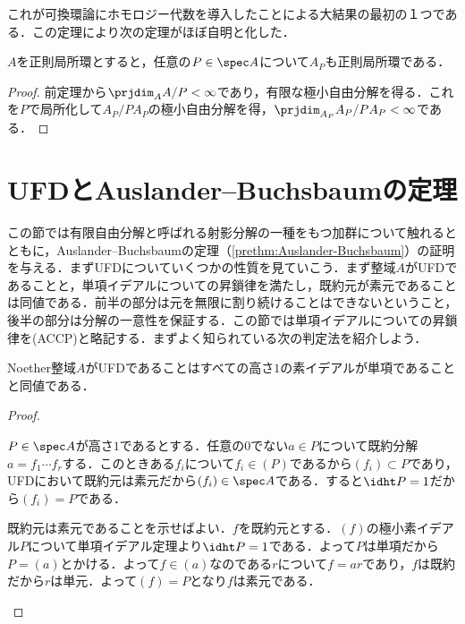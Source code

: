これが可換環論にホモロジー代数を導入したことによる大結果の最初の１つである．この定理により次の定理がほぼ自明と化した．
\begin{thm}[Serreの定理]\label{thm:Serreの定理}
	$A$を正則局所環とすると，任意の$P\in\spec A$について$A_P$も正則局所環である．
\end{thm}

\begin{proof}
	前定理から$\prjdim_A A/P<\infty$であり，有限な極小自由分解を得る．これを$P$で局所化して$A_P/PA_P$の極小自由分解を得，$\prjdim_{A_P} A_P/PA_P<\infty$である．
\end{proof}

\section{UFDとAuslander--Buchsbaumの定理}

この節では有限自由分解と呼ばれる射影分解の一種をもつ加群について触れるとともに，Auslander--Buchsbaumの定理（\ref{prethm:Auslander-Buchsbaum}）の証明を与える．まずUFDについていくつかの性質を見ていこう．まず整域$A$がUFDであることと，単項イデアルについての昇鎖律を満たし，既約元が素元であることは同値である．前半の部分は元を無限に割り続けることはできないということ，後半の部分は分解の一意性を保証する．この節では単項イデアルについての昇鎖律を(ACCP)と略記する．まずよく知られている次の判定法を紹介しよう．

\begin{prop}\label{prop:UFD判定}
	Noether整域$A$がUFDであることはすべての高さ$1$の素イデアルが単項であることと同値である．
\end{prop}

\begin{proof}
	\begin{eqv}
		\item $P\in\spec A$が高さ$1$であるとする．任意の$0$でない$a\in P$について既約分解$a=f_1\cdots f_r$する．このときある$f_i$について$f_i\in (P)$であるから$(f_i)\subset P$であり，UFDにおいて既約元は素元だから$(f_i)\in\spec A$である．すると$\idht P=1$だから$(f_i)=P$である．
		\item 既約元は素元であることを示せばよい．$f$を既約元とする．$(f)$の極小素イデアル$P$について単項イデアル定理より$\idht P=1$である．よって$P$は単項だから$P=(a)$とかける．よって$f\in (a)$なのである$r$について$f=ar$であり，$f$は既約だから$r$は単元．よって$(f)=P$となり$f$は素元である．
	\end{eqv}
\end{proof}

